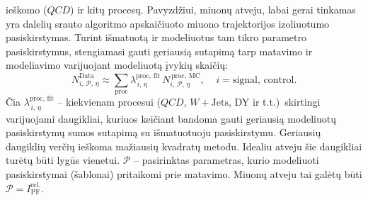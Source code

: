 \documentclass[a4paper, 12pt, oneside]{article}
\newcommand{\tbarW}{\bar{t}W}
\newcommand{\ttbar}{t\bar{t}}
\newcommand{\WJets}{W\! +\!\mathrm{Jets}}
\newcommand{\QCD}{QC\! D}
\newlength\q
\begin{document}
\begin{enumerate}
	ieškomo ($\QCD$) ir kitų procesų.
	Pavyzdžiui, miuonų atveju, labai gerai tinkamas yra dalelių srauto algoritmo apskaičiuoto miuono trajektorijos izoliuotumo
	pasiskirstymas.
	Turint išmatuotą ir modeliuotus tam tikro parametro pasiskirstymus, stengiamasi gauti geriausią sutapimą tarp matavimo ir
	modeliavimo varijuojant modeliuotą įvykių skaičių:
	\begin{equation}
		N^{\mathrm{Data}}_{i, \, \mathcal{P}, \, \eta} \approx \sum_{\mathrm{proc}}
		\lambda^{\mathrm{proc,\, fit}}_{\,i, \, \eta}\, N^{\,\mathrm{proc,\, MC}}_{i, \, \mathcal{P}, \, \eta},
		\;\;\;\; i = \mathrm{signal}, \, \mathrm{control}.
	\end{equation}
	Čia $\lambda^{\mathrm{proc,\, fit}}_{\,i, \, \eta}$ -- kiekvienam procesui ($\QCD$, $\WJets$, DY ir t.t.)\ skirtingi varijuojami daugikliai,
	kuriuos keičiant bandoma gauti geriausią modeliuotų pasiskirstymų sumos sutapimą su išmatuotuoju pasiskirstymu.
	Geriausių daugiklių verčių ieškoma mažiausių kvadratų metodu.
	Idealiu atveju šie daugikliai turėtų būti lygūs vienetui. 
	$\mathcal{P}$ -- pasirinktas parametras, kurio modeliuoti pasiskirstymai (šablonai) pritaikomi prie matavimo.
	Miuonų atveju tai galėtų būti $\mathcal{P}=I^{\mathrm{rel.}}_{\mathrm{PF}}$.

\end{enumerate}
\end{document}
